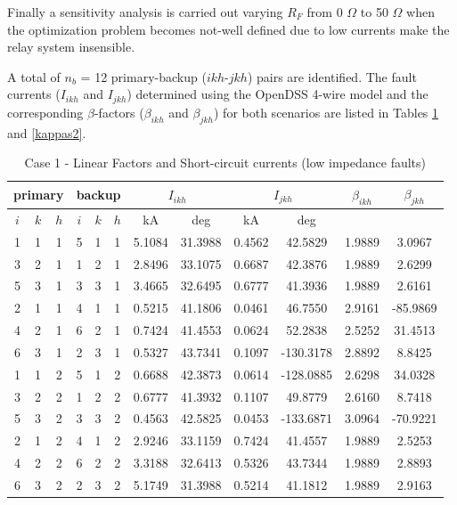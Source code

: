 \documentclass[letterpaper, 10 pt, conference]{IEEEtran}
\begin{document}
Finally a sensitivity analysis is carried out varying $R_F$  from 0  $\Omega$ to 50  $\Omega$  when the optimization problem becomes not-well defined due to low currents make the relay system insensible.

A total of $n_b$ = 12 primary-backup ($ikh$-$jkh$) pairs are identified. The fault currents ($I_{ikh}$ and $I_{jkh}$) determined using the OpenDSS 4-wire model and the corresponding $\beta$-factors ($\beta_{ikh}$ and $\beta_{jkh}$) for both scenarios are listed in Tables \ref{kappas} and \ref{kappas2}.


  \begin{table}[h!]\centering\label{kappas}
\begin{tabular}{ccc|ccc|cc|cc|c|c}\hline
 \multicolumn{3}{c|}{primary}  &  \multicolumn{3}{|c|}{backup}  &  \multicolumn{2}{|c|}{$I_{ikh}$}
  &  \multicolumn{2}{|c|}{$I_{jkh}$} & $\beta_{ikh} $  &  $\beta_{jkh}$\\\hline
$i$ &   $k$&    $h$     &  $i$ &   $k$&    $h$     & kA & deg & kA & deg & & \\\hline
1	&	1	&	1	&	5	&	1	&	1	&	5.1084	&	31.3988	&	0.4562	&	42.5829	&	1.9889	&	3.0967	\\	
3	&	2	&	1	&	1	&	2	&	1	&	2.8496	&	33.1075	&	0.6687	&	42.3876	&	1.9889	&	2.6299	\\	
5	&	3	&	1	&	3	&	3	&	1	&	3.4665	&	32.6495	&	0.6777	&	41.3936	&	1.9889	&	2.6161	\\	
2	&	1	&	1	&	4	&	1	&	1	&	0.5215	&	41.1806	&	0.0461	&	46.7550	&	2.9161	&	-85.9869	\\	
4	&	2	&	1	&	6	&	2	&	1	&	0.7424	&	41.4553	&	0.0624	&	52.2838	&	2.5252	&	31.4513	\\	
6	&	3	&	1	&	2	&	3	&	1	&	0.5327	&	43.7341	&	0.1097	&	-130.3178	&	2.8892	&	8.8425	\\	
1	&	1	&	2	&	5	&	1	&	2	&	0.6688	&	42.3873	&	0.0614	&	-128.0885	&	2.6298	&	34.0328	\\	
3	&	2	&	2	&	1	&	2	&	2	&	0.6777	&	41.3932	&	0.1107	&	49.8779	&	2.6160	&	8.7418	\\	
5	&	3	&	2	&	3	&	3	&	2	&	0.4563	&	42.5825	&	0.0453	&	-133.6871	&	3.0964	&	-70.9221	\\	
2	&	1	&	2	&	4	&	1	&	2	&	2.9246	&	33.1159	&	0.7424	&	41.4557	&	1.9889	&	2.5253	\\	
4	&	2	&	2	&	6	&	2	&	2	&	3.3188	&	32.6413	&	0.5326	&	43.7344	&	1.9889	&	2.8893	\\	
6	&	3	&	2	&	2	&	3	&	2	&	5.1749	&	31.3988	&	0.5214	&	41.1812	&	1.9889	&	2.9163	\\	

\hline
  \end{tabular}
  \caption{Case 1 - Linear Factors and Short-circuit currents (low impedance faults)}
\end{table}
\end{document}
